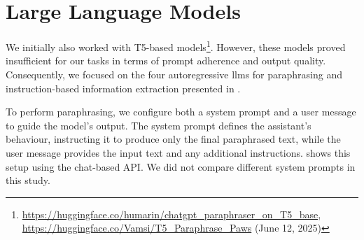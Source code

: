 \chapter{Large Language Models}
\label{app:language_models}

We initially also worked with T5-based models\footnote{\url{https://huggingface.co/humarin/chatgpt_paraphraser_on_T5_base},\\ \url{https://huggingface.co/Vamsi/T5_Paraphrase_Paws} (June 12, 2025)}. However, these models proved insufficient for our tasks in terms of prompt adherence and output quality. 
Consequently, we focused on the four autoregressive \acp{llm} for paraphrasing and instruction-based information extraction presented in .

\begin{table}[h]
\centering
\caption{Collection of multilingual \acp{llm} used for paraphrasing\protect\footnotemark.}
\label{tab:llm_paraphrasers}
\end{table}

To perform paraphrasing, we configure both a system prompt and a user message to guide the model's output. 
The system prompt defines the assistant’s behaviour, instructing it to produce only the final paraphrased text, while the user message provides the input text and any additional instructions. 
 shows this setup using the chat-based API.
We did not compare different system prompts in this study.


